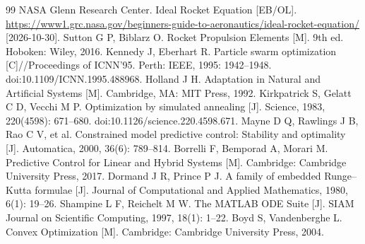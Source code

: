 \begin{thebibliography}{99}
NASA Glenn Research Center. Ideal Rocket Equation [EB/OL].
\url{https://www1.grc.nasa.gov/beginners-guide-to-aeronautics/ideal-rocket-equation/}
[2026-10-30].
Sutton G P, Biblarz O. Rocket Propulsion Elements [M]. 9th ed. Hoboken: Wiley, 2016.
Kennedy J, Eberhart R. Particle swarm optimization [C]//Proceedings of ICNN'95.
Perth: IEEE, 1995: 1942--1948. doi:10.1109/ICNN.1995.488968.
Holland J H. Adaptation in Natural and Artificial Systems [M].
Cambridge, MA: MIT Press, 1992.
Kirkpatrick S, Gelatt C D, Vecchi M P. Optimization by simulated annealing [J].
Science, 1983, 220(4598): 671--680. doi:10.1126/science.220.4598.671.
Mayne D Q, Rawlings J B, Rao C V, et al. Constrained model predictive control:
Stability and optimality [J]. Automatica, 2000, 36(6): 789--814.
Borrelli F, Bemporad A, Morari M. Predictive Control for Linear and Hybrid Systems [M].
Cambridge: Cambridge University Press, 2017.
Dormand J R, Prince P J. A family of embedded Runge--Kutta formulae [J].
Journal of Computational and Applied Mathematics, 1980, 6(1): 19--26.
Shampine L F, Reichelt M W. The MATLAB ODE Suite [J].
SIAM Journal on Scientific Computing, 1997, 18(1): 1--22.
Boyd S, Vandenberghe L. Convex Optimization [M].
Cambridge: Cambridge University Press, 2004.
\end{thebibliography}
